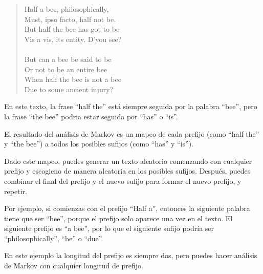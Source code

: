 \documentclass[10pt]{book}
\begin{document}
\begin{quote}
Half a bee, philosophically, \\
Must, ipso facto, half not be. \\
But half the bee has got to be \\
Vis a vis, its entity. D'you see? \\
\\
But can a bee be said to be \\
Or not to be an entire bee \\
When half the bee is not a bee \\
Due to some ancient injury? \\
\end{quote}
%
En este texto,
la frase ``half the'' está siempre seguida por la palabra ``bee'',
pero la frase ``the bee'' podria estar seguida por
``has'' o ``is''.

El resultado del análisis de Markov es un mapeo de cada prefijo
(como ``half the'' y ``the bee'') a todos los posibles sufijos
(como ``has'' y ``is'').

Dado este mapeo, puedes generar un texto aleatorio
comenzando con cualquier prefijo y escogieno de manera aleatoria
en los posibles sufijos.  Después, puedes combinar el final del
prefijo y el nuevo sufijo para formar el nuevo prefijo, y repetir.

Por ejemplo, si comienzas con el prefijo ``Half a'', entonces la
siguiente palabra tiene que ser ``bee'', porque el prefijo solo aparece
una vez en el texto.  El siguiente prefijo es ``a bee'', por lo que el
siguiente sufijo podría ser ``philosophically'', ``be'' o ``due''.

En este ejemplo la longitud del prefijo es siempre dos, pero
puedes hacer análisis de Markov con cualquier longitud de prefijo.
\end{document}
